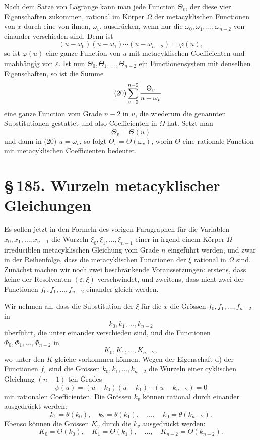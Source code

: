 \documentclass[11pt]{article}
\providecommand{\sect}[2]{\section*{\S\,#1. #2}}
\begin{document}
Nach dem Satze von Lagrange kann man jede Function $\Theta_v$, der diese vier Eigenschaften zukommen, rational im K\"orper $\Omega$ der metacyklischen Functionen von $x$ durch eine von ihnen, $\omega_v$, ausdr\"ucken, wenn nur die $\omega_0,\omega_1,\ldots,\omega_{n-2}$ von einander verschieden sind. Denn ist
\begin{equation}\tag{19}
  (u-\omega_0)(u-\omega_1)\cdots(u-\omega_{n-2})=\varphi(u),
\end{equation}
so ist $\varphi(u)$ eine ganze Function von $u$ mit metacyklischen Coefficienten und unabh\"angig von $\varepsilon$. Ist nun $\Theta_0,\Theta_1,\ldots,\Theta_{n-2}$ ein Functionensystem mit denselben Eigenschaften, so ist die Summe
\begin{equation}\tag{20}
  \sum_{v=0}^{n-2}{\Theta_v\over u-\omega_v}
\end{equation}
eine ganze Function vom Grade $n-2$ in $u$, die wiederum die genannten Substitutionen gestattet und also Coefficienten in $\Omega$ hat. Setzt man
\begin{equation}\tag{21}
  \Theta_v=\Theta(u)
\end{equation}
und dann in (20) $u=\omega_v$, so folgt $\Theta_v=\Theta(\omega_v)$, worin $\Theta$ eine rationale Function mit metacyklischen Coefficienten bedeutet.

\sect{185}{Wurzeln metacyklischer Gleichungen}

Es sollen jetzt in den Formeln des vorigen Paragraphen f\"ur die Variablen $x_0,x_1,\ldots,x_{n-1}$ die Wurzeln $\xi_0,\xi_1,\ldots,\xi_{n-1}$ einer in irgend einem K\"orper $\Omega$ irreduciblen metacyklischen Gleichung vom Grade $n$ eingef\"uhrt werden, und zwar in der Reihenfolge, dass die metacyklischen Functionen der $\xi$ rational in $\Omega$ sind. Zun\"achst machen wir noch zwei beschr\"ankende Voraussetzungen: erstens, dass keine der Resolventen $(\varepsilon,\xi)$ verschwindet, und zweitens, dass nicht zwei der Functionen $f_0,f_1,\ldots,f_{n-2}$ einander gleich werden.

Wir nehmen an, dass die Substitution der $\xi$ f\"ur die $x$ die Gr\"ossen $f_0,f_1,\ldots,f_{n-2}$ in
\[
  k_0,k_1,\ldots,k_{n-2}
\]
\"uberf\"uhrt, die unter einander verschieden sind, und die Functionen $\Phi_0,\Phi_1,\ldots,\Phi_{n-2}$ in
\[
  K_0,K_1,\ldots,K_{n-2},
\]
wo unter den $K$ gleiche vorkommen k\"onnen. Wegen der Eigenschaft d) der Functionen $f_v$ sind die Gr\"ossen $k_0,k_1,\ldots,k_{n-2}$ die Wurzeln einer cyklischen Gleichung $(n-1)$-ten Grades
\begin{equation}\tag{1}
  \psi(u)=(u-k_0)(u-k_1)\cdots(u-k_{n-2})=0
\end{equation}
mit rationalen Coefficienten. Die Gr\"ossen $k_v$ k\"onnen rational durch einander ausgedr\"uckt werden:
\begin{equation}\tag{2}
  k_1=\theta(k_0),\quad k_2=\theta(k_1),\quad\ldots,\quad k_0=\theta(k_{n-2}).
\end{equation}
Ebenso k\"onnen die Gr\"ossen $K_v$ durch die $k_v$ ausgedr\"uckt werden:
\begin{equation}\tag{3}
  K_0=\Theta(k_0),\quad K_1=\Theta(k_1),\quad\ldots,\quad K_{n-2}=\Theta(k_{n-2}).
\end{equation}
\end{document}
